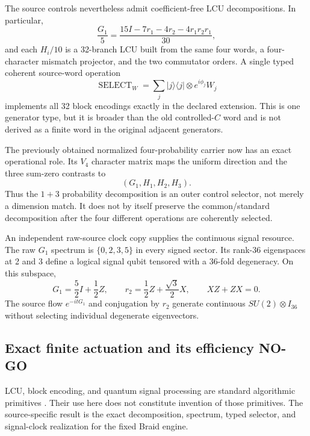\documentclass[11pt]{article}
\theoremstyle{definition}
\theoremstyle{remark}
\begin{document}
The source controls nevertheless admit coefficient-free LCU decompositions. In particular,
\begin{equation}
 \frac{G_1}{5}=\frac{15I-7r_1-4r_2-4r_1r_2r_1}{30},
\end{equation}
and each $H_i/10$ is a 32-branch LCU built from the same four words, a four-character mismatch projector, and the two commutator orders. A single typed coherent source-word operation
\begin{equation}
 \operatorname{SELECT}_W=\sum_j |j\rangle\!\langle j|\otimes e^{i\phi_j}W_j
 \end{equation}
implements all 32 block encodings exactly in the declared extension. This is one generator type, but it is broader than the old controlled-$C$ word and is not derived as a finite word in the original adjacent generators.

The previously obtained normalized four-probability carrier now has an exact operational role. Its $V_4$ character matrix maps the uniform direction and the three sum-zero contrasts to
\begin{equation}
 (G_1,H_1,H_2,H_3).
\end{equation}
Thus the $1+3$ probability decomposition is an outer control selector, not merely a dimension match. It does not by itself preserve the common/standard decomposition after the four different operations are coherently selected.

An independent raw-source clock copy supplies the continuous signal resource. The raw $G_1$ spectrum is $\{0,2,3,5\}$ in every signed sector. Its rank-36 eigenspaces at 2 and 3 define a logical signal qubit tensored with a 36-fold degeneracy. On this subspace,
\begin{equation}
 G_1=\frac52I+\frac12Z,\qquad
 r_2=\frac12Z+\frac{\sqrt3}{2}X,\qquad XZ+ZX=0.
\end{equation}
The source flow $e^{-itG_1}$ and conjugation by $r_2$ generate continuous $SU(2)\otimes I_{36}$ without selecting individual degenerate eigenvectors.

\subsection{Exact finite actuation and its efficiency NO-GO}

LCU, block encoding, and quantum signal processing are standard algorithmic primitives \cite{childswiebe2012,lowchuang2017,gilyen2019}. Their use here does not constitute invention of those primitives. The source-specific result is the exact decomposition, spectrum, typed selector, and signal-clock realization for the fixed Braid engine.
\end{document}
